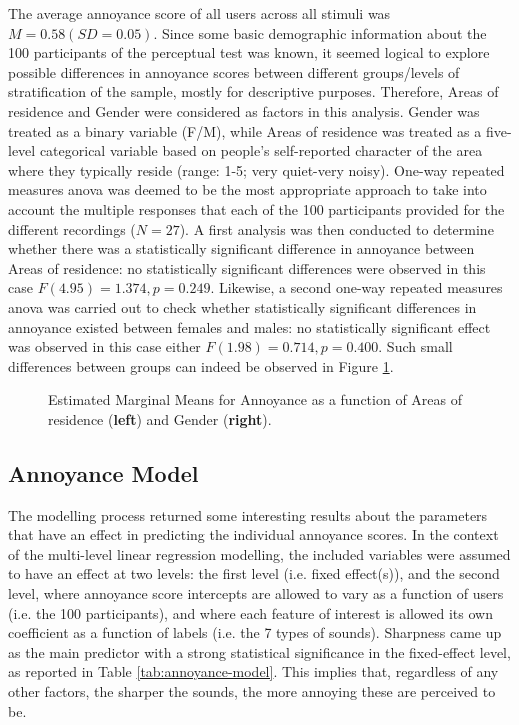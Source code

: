 The average annoyance score of all users across all stimuli was $M=0.58 (SD=0.05)$. Since some basic demographic information about the 100 participants of the perceptual test was known, it seemed logical to explore possible differences in annoyance scores between different groups/levels of stratification of the sample, mostly for descriptive purposes. Therefore, Areas of residence and Gender were considered as factors in this analysis. Gender was treated as a binary variable (F/M), while Areas of residence was treated as a five-level categorical variable based on people's self-reported character of the area where they typically reside (range: 1-5; very quiet-very noisy). One-way repeated measures \gls{anova} was deemed to be the most appropriate approach to take into account the multiple responses that each of the 100 participants provided for the different recordings ($N=27$). A first analysis was then conducted to determine whether there was a statistically significant difference in annoyance between Areas of residence: no statistically significant differences were observed in this case $F(4.95)=1.374, p=0.249$. Likewise, a second one-way repeated measures \gls{anova} was carried out to check whether statistically significant differences in annoyance existed between females and males: no statistically significant effect was observed in this case either $F(1.98)=0.714, p=0.400$. Such small differences between groups can indeed be observed in Figure \ref{fig:anova}.

\begin{figure}
  \label{fig:anova}
  \centering
  \caption{Estimated Marginal Means for Annoyance as a function of Areas of residence (\textbf{left}) and Gender (\textbf{right}).}
\end{figure}

\subsection{Annoyance Model}
The modelling process returned some interesting results about the parameters that have an effect in predicting the individual annoyance scores. In the context of the multi-level linear regression modelling, the included variables were assumed to have an effect at two levels: the first level (i.e. fixed effect(s)), and the second level, where annoyance score intercepts are allowed to vary as a function of users (i.e. the 100 participants), and where each feature of interest is allowed its own coefficient as a function of labels (i.e. the 7 types of sounds). Sharpness came up as the main predictor with a strong statistical significance in the fixed-effect level, as reported in Table \ref{tab:annoyance-model}. This implies that, regardless of any other factors, the sharper the sounds, the more annoying these are perceived to be.

